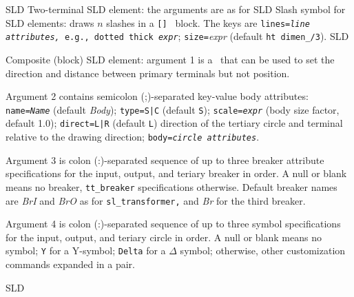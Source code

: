 %
  {SLD}%
  {Two-terminal SLD element: the arguments are as for 
   }%
%
  {SLD}%
  {Slash symbol for SLD elements: draws $n$ slashes in a {\tt [] } block.
   The keys are
   {\tt lines={\sl line attributes,} e.g., dotted thick {\sl expr}};
   {\tt size=}{\sl expr} (default {\tt ht dimen\_/3}).
   }%
%
%
  {SLD}%
  {Composite (block) SLD element: argument 1 is a \linespec\ that can be used
   to set the direction and distance between primary terminals but not
   position.

   Argument 2 contains semicolon (;)-separated key-value body attributes:
   {\tt name={\sl{}Name}} (default {\sl Body});
   {\tt type=S|C} (default {\tt S});
   {\tt scale={\sl expr}} (body size factor, default 1.0);
   {\tt direct=L|R} (default {\tt L}) direction of the tertiary
     circle and terminal relative to the drawing direction;
   {\tt body={\sl circle attributes}}.

   Argument 3 is colon (:)-separated sequence of up to three breaker
   attribute specifications for the input, output, and teriary breaker
   in order.  A null or blank means no breaker, {\tt tt\_breaker}%
   specifications otherwise. Default breaker names are {\sl BrI}%
   and {\sl BrO} as for
   {\tt sl\_transformer,} and {\sl Br} for the third breaker. 

   Argument 4 is colon (:)-separated sequence of up to three symbol
   specifications for the input, output, and teriary circle
   in order.  A null or blank means no symbol;
   {\tt Y} for a Y-symbol;
   {\tt Delta} for a $\Delta$ symbol;
   otherwise, other customization commands expanded in a {\tt \lbr\rbr} pair.
   }%
%
%
  {SLD}%
